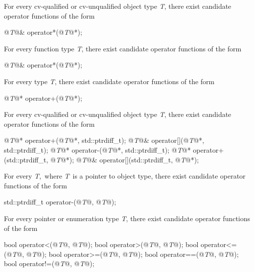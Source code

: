 \documentclass[american]{book}
\begin{document}
\setcounter{Paras}{4}

\pnum
For every cv-qualified or cv-unqualified object type
\textit{T}, 
there exist candidate operator functions of the form

\begin{codeblock}
@\textit{T}@&    operator*(@\textit{T}@*);
\end{codeblock}

\pnum
For every function type
\textit{T}, 
there exist candidate operator functions of the form

\begin{codeblock}
@\textit{T}@&    operator*(@\textit{T}@*);
\end{codeblock}

\pnum
For every type
\textit{T}, 
there exist candidate operator functions of the form

\begin{codeblock}
@\textit{T}@*    operator+(@\textit{T}@*);
\end{codeblock}

\setcounter{Paras}{12}
\pnum
For every cv-qualified or cv-unqualified object type
\textit{T}, 
there exist candidate operator functions of the form

\begin{codeblock}
@\textit{T}@*      operator+(@\textit{T}@*, std::ptrdiff_t);
@\textit{T}@&      operator[](@\textit{T}@*, std::ptrdiff_t);
@\textit{T}@*      operator-(@\textit{T}@*, std::ptrdiff_t);
@\textit{T}@*      operator+(std::ptrdiff_t, @\textit{T}@*);
@\textit{T}@&      operator[](std::ptrdiff_t, @\textit{T}@*);
\end{codeblock}

\pnum
For every 
\textit{T},\
where
\textit{T}\
is a pointer to object type, 
there exist candidate operator functions of the form

\begin{codeblock}
std::ptrdiff_t   operator-(@\textit{T}\addedCC{*}@, @\textit{T}\addedCC{*}@);
\end{codeblock}

\pnum
For every pointer or enumeration type
\textit{T}, 
there exist candidate operator functions of the form

\begin{codeblock}
bool    operator<(@\textit{T}@, @\textit{T}@);
bool    operator>(@\textit{T}@, @\textit{T}@);
bool    operator<=(@\textit{T}@, @\textit{T}@);
bool    operator>=(@\textit{T}@, @\textit{T}@);
bool    operator==(@\textit{T}@, @\textit{T}@);
bool    operator!=(@\textit{T}@, @\textit{T}@);
\end{codeblock}
\end{document}
